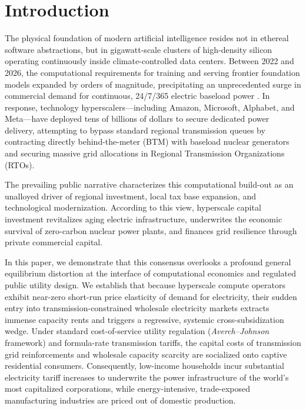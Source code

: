 \documentclass[11pt,a4paper]{article}
\begin{document}
\newpage

\section{Introduction}

The physical foundation of modern artificial intelligence resides not in ethereal software abstractions, but in gigawatt-scale clusters of high-density silicon operating continuously inside climate-controlled data centers. Between 2022 and 2026, the computational requirements for training and serving frontier foundation models expanded by orders of magnitude, precipitating an unprecedented surge in commercial demand for continuous, 24/7/365 electric baseload power \citep{davis2024hyperscale}. In response, technology hyperscalers---including Amazon, Microsoft, Alphabet, and Meta---have deployed tens of billions of dollars to secure dedicated power delivery, attempting to bypass standard regional transmission queues by contracting directly behind-the-meter (BTM) with baseload nuclear generators and securing massive grid allocations in Regional Transmission Organizations (RTOs).

The prevailing public narrative characterizes this computational build-out as an unalloyed driver of regional investment, local tax base expansion, and technological modernization. According to this view, hyperscale capital investment revitalizes aging electric infrastructure, underwrites the economic survival of zero-carbon nuclear power plants, and finances grid resilience through private commercial capital.

In this paper, we demonstrate that this consensus overlooks a profound general equilibrium distortion at the interface of computational economics and regulated public utility design. We establish that because hyperscale compute operators exhibit near-zero short-run price elasticity of demand for electricity, their sudden entry into transmission-constrained wholesale electricity markets extracts immense capacity rents and triggers a regressive, systemic cross-subsidization wedge. Under standard cost-of-service utility regulation (\emph{Averch--Johnson} framework) and formula-rate transmission tariffs, the capital costs of transmission grid reinforcements and wholesale capacity scarcity are socialized onto captive residential consumers. Consequently, low-income households incur substantial electricity tariff increases to underwrite the power infrastructure of the world's most capitalized corporations, while energy-intensive, trade-exposed manufacturing industries are priced out of domestic production.
\end{document}

